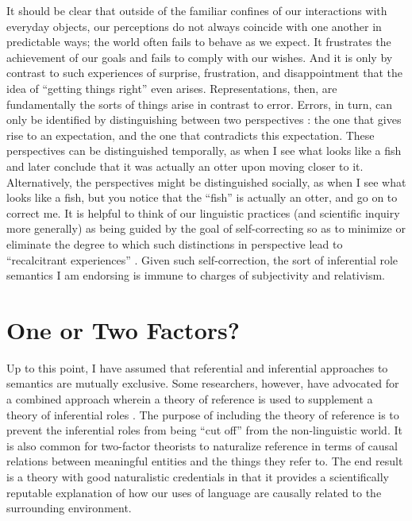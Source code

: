 It should be clear that outside of the familiar confines of our interactions with everyday objects, our perceptions do not always coincide with one another in predictable ways; the world often fails to behave as we expect. It frustrates the achievement of our goals and fails to comply with our wishes. And it is only by contrast to such experiences of surprise, frustration, and disappointment that the idea of ``getting things right'' even arises. Representations, then, are fundamentally the sorts of things arise in contrast to error. Errors, in turn, can only be identified by distinguishing between two perspectives \citep[see][]{Brandom:1994}: the one that gives rise to an expectation, and the one that contradicts this expectation. These perspectives can be distinguished temporally, as when I see what looks like a fish and later conclude that it was actually an otter upon moving closer to it. Alternatively, the perspectives might be distinguished socially, as when I see what looks like a fish, but you notice that the ``fish'' is actually an otter, and go on to correct me. It is helpful to think of our linguistic practices (and scientific inquiry more generally) as being guided by the goal of self-correcting so as to minimize or eliminate the degree to which such distinctions in perspective lead to ``recalcitrant experiences'' \citep{Misak:2013}. Given such self-correction, the sort of inferential role semantics I am endorsing is immune to charges of subjectivity and relativism. 

\section{One or Two Factors?}

Up to this point, I have assumed that referential and inferential approaches to semantics are mutually exclusive. Some researchers, however, have advocated for a combined approach wherein a theory of reference is used to supplement a theory of inferential roles \citep[e.g.,][]{Eliasmith:2000,Block:1986}. The purpose of including the theory of reference is to prevent the inferential roles from being ``cut off'' from the non-linguistic world. It is also common for two-factor theorists to naturalize reference in terms of causal relations between meaningful entities and the things they refer to. The end result is a theory with good naturalistic credentials in that it provides a scientifically reputable explanation of how our uses of language are causally related to the surrounding environment.  

